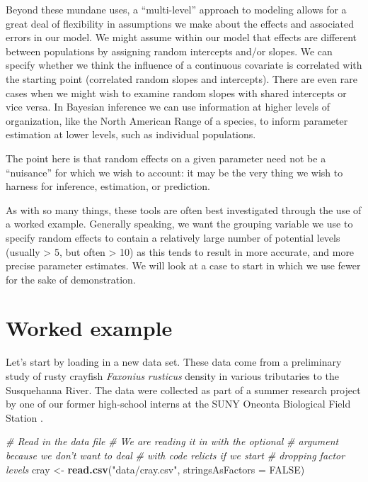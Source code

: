 \documentclass[
]{book}
\newenvironment{Shaded}{\begin{snugshade}}{\end{snugshade}}
\newcommand{\CommentTok}[1]{\textcolor[rgb]{0.56,0.35,0.01}{\textit{#1}}}
\newcommand{\DataTypeTok}[1]{\textcolor[rgb]{0.13,0.29,0.53}{#1}}
\newcommand{\KeywordTok}[1]{\textcolor[rgb]{0.13,0.29,0.53}{\textbf{#1}}}
\newcommand{\NormalTok}[1]{#1}
\newcommand{\OtherTok}[1]{\textcolor[rgb]{0.56,0.35,0.01}{#1}}
\newcommand{\StringTok}[1]{\textcolor[rgb]{0.31,0.60,0.02}{#1}}
\begin{document}
Beyond these mundane uses, a ``multi-level'' approach to modeling allows for a great deal of flexibility in assumptions we make about the effects and associated errors in our model. We might assume within our model that effects are different between populations by assigning random intercepts and/or slopes. We can specify whether we think the influence of a continuous covariate is correlated with the starting point (correlated random slopes and intercepts). There are even rare cases when we might wish to examine random slopes with shared intercepts or vice versa. In Bayesian inference we can use information at higher levels of organization, like the North American Range of a species, to inform parameter estimation at lower levels, such as individual populations.

The point here is that random effects on a given parameter need not be a ``nuisance'' for which we wish to account: it may be the very thing we wish to harness for inference, estimation, or prediction.

As with so many things, these tools are often best investigated through the use of a worked example. Generally speaking, we want the grouping variable we use to specify random effects to contain a relatively large number of potential levels (usually \textgreater{} 5, but often \textgreater{} 10) as this tends to result in more accurate, and more precise parameter estimates. We will look at a case to start in which we use fewer for the sake of demonstration.

\hypertarget{lmm-worked}{%
\section{Worked example}\label{lmm-worked}}

Let's start by loading in a new data set. These data come from a preliminary study of rusty crayfish \emph{Faxonius} \emph{rusticus} density in various tributaries to the Susquehanna River. The data were collected as part of a summer research project by one of our former high-school interns at the SUNY Oneonta Biological Field Station .

\begin{Shaded}
\begin{Highlighting}[]
\CommentTok{# Read in the data file}
\CommentTok{# We are reading it in with the optional}
\CommentTok{# argument because we don't want to deal}
\CommentTok{# with code relicts if we start}
\CommentTok{# dropping factor levels}
\NormalTok{cray <-}\StringTok{ }\KeywordTok{read.csv}\NormalTok{(}\StringTok{"data/cray.csv"}\NormalTok{, }\DataTypeTok{stringsAsFactors =} \OtherTok{FALSE}\NormalTok{)}
\end{Highlighting}
\end{Shaded}
\end{document}

